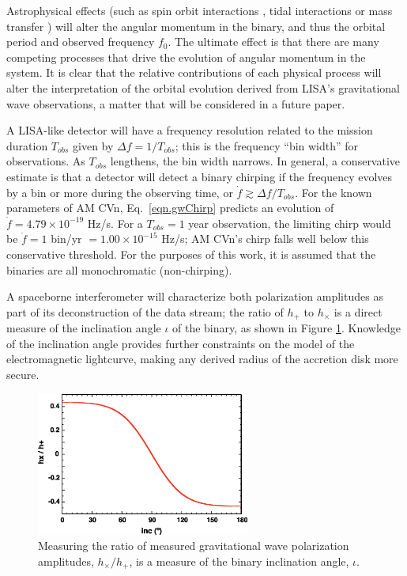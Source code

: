 \documentclass[preprint2]{aastex}
\begin{document}
Astrophysical effects (such as spin orbit interactions \citep{Hut1981},
tidal interactions \citep{wvk2008} or mass transfer
\citep{DeloyeTaam2006}) will alter the angular momentum in the binary,
and thus the orbital period and observed frequency $f_{0}$.  The
ultimate effect is that there are many competing processes that drive
the evolution of angular momentum in the system.  It is clear that the
relative contributions of each physical process will alter the
interpretation of the orbital evolution derived from LISA's
gravitational wave observations, a matter that will be considered in a
future paper.

A LISA-like detector will have a frequency resolution related to the
mission duration $T_{obs}$ given by $\Delta f = 1/T_{obs}$; this is
the frequency ``bin width'' for observations.  As $T_{obs}$ lengthens,
the bin width narrows.  In general, a conservative estimate is that a
detector will detect a binary chirping if the frequency evolves by a
bin or more during the observing time, or ${\dot f} \gtrsim \Delta
f/T_{obs}$.  For the known parameters of AM CVn, Eq.\
\ref{eqn.gwChirp} predicts an evolution of ${\dot f} = 4.79 \times
10^{-19}$ Hz/s.  For a $T_{obs} = 1$ year observation, the limiting
chirp would be ${\dot f} = 1$ bin/yr $= 1.00 \times 10^{-15}$ Hz/s; AM
CVn's chirp falls well below this conservative threshold.  For the
purposes of this work, it is assumed that the binaries are all
monochromatic (non-chirping).

A spaceborne interferometer will characterize both {polarization} amplitudes as part
of its deconstruction of the data stream; the ratio of $h_{+}$ to
$h_{\times}$ is a direct measure of the inclination angle $\iota$ of
the binary, as shown in Figure \ref{fig.inclination}.  Knowledge of
the inclination angle provides further constraints on the model of the
electromagnetic lightcurve, making any derived radius of the
accretion disk more secure.
        
\begin{figure}[t!]
  \centering
  \includegraphics[width=70mm]{./gwInclination.eps} 
  \caption{{\small Measuring the ratio of measured gravitational wave 
  polarization amplitudes, $h_{\times}/h_{+}$, is a measure of 
  the binary inclination angle, $\iota$.}}
  \label{fig.inclination}
\end{figure}
\end{document}
